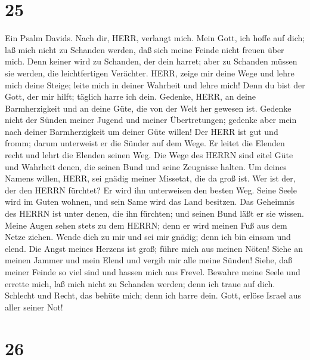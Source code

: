 \hypertarget{section-24}{%
\section{25}\label{section-24}}

 Ein Psalm Davids. Nach dir, HERR, verlangt mich.
 Mein Gott, ich hoffe auf dich; laß mich nicht zu Schanden
werden, daß sich meine Feinde nicht freuen über mich.  Denn
keiner wird zu Schanden, der dein harret; aber zu Schanden müssen sie
werden, die leichtfertigen Verächter.  HERR, zeige mir deine
Wege und lehre mich deine Steige;  leite mich in deiner
Wahrheit und lehre mich! Denn du bist der Gott, der mir hilft; täglich
harre ich dein.  Gedenke, HERR, an deine Barmherzigkeit und
an deine Güte, die von der Welt her gewesen ist.  Gedenke
nicht der Sünden meiner Jugend und meiner Übertretungen; gedenke aber
mein nach deiner Barmherzigkeit um deiner Güte willen!  Der
HERR ist gut und fromm; darum unterweist er die Sünder auf dem Wege.
 Er leitet die Elenden recht und lehrt die Elenden seinen
Weg.  Die Wege des HERRN sind eitel Güte und Wahrheit
denen, die seinen Bund und seine Zeugnisse halten.  Um
deines Namens willen, HERR, sei gnädig meiner Missetat, die da groß ist.
 Wer ist der, der den HERRN fürchtet? Er wird ihn
unterweisen den besten Weg.  Seine Seele wird im Guten
wohnen, und sein Same wird das Land besitzen.  Das
Geheimnis des HERRN ist unter denen, die ihn fürchten; und seinen Bund
läßt er sie wissen.  Meine Augen sehen stets zu dem HERRN;
denn er wird meinen Fuß aus dem Netze ziehen.  Wende dich
zu mir und sei mir gnädig; denn ich bin einsam und elend. 
Die Angst meines Herzens ist groß; führe mich aus meinen Nöten!
 Siehe an meinen Jammer und mein Elend und vergib mir alle
meine Sünden!  Siehe, daß meiner Feinde so viel sind und
hassen mich aus Frevel.  Bewahre meine Seele und errette
mich, laß mich nicht zu Schanden werden; denn ich traue auf dich.
 Schlecht und Recht, das behüte mich; denn ich harre dein.
 Gott, erlöse Israel aus aller seiner Not!

\hypertarget{section-25}{%
\section{26}\label{section-25}}

